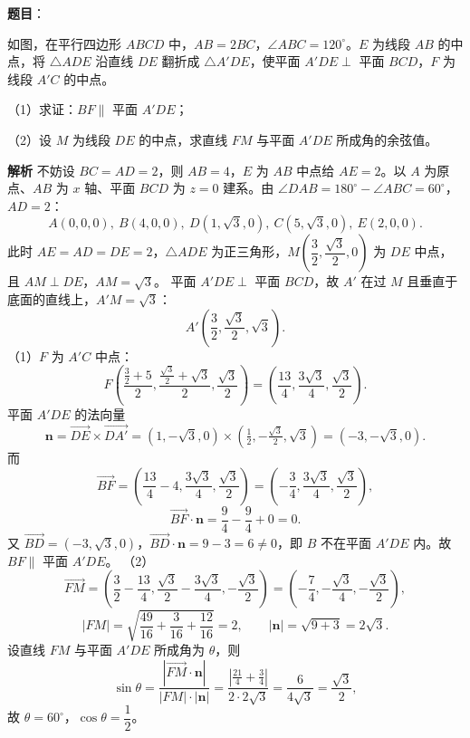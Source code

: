 \begin{answer}

\textbf{题目}：

如图，在平行四边形 $ABCD$ 中，$AB=2BC$，$\angle ABC=120^\circ$。$E$ 为线段 $AB$ 的中点，将 $\triangle ADE$ 沿直线 $DE$ 翻折成 $\triangle A'DE$，使平面 $A'DE\perp$ 平面 $BCD$，$F$ 为线段 $A'C$ 的中点。

（1）求证：$BF\parallel$ 平面 $A'DE$；

（2）设 $M$ 为线段 $DE$ 的中点，求直线 $FM$ 与平面 $A'DE$ 所成角的余弦值。
\nopagebreak[4]
\begin{center}\end{center}
\nopagebreak[4]
\textbf{解析}
不妨设 $BC=AD=2$，则 $AB=4$，$E$ 为 $AB$ 中点给 $AE=2$。以 $A$ 为原点、$AB$ 为 $x$ 轴、平面 $BCD$ 为 $z=0$ 建系。由 $\angle DAB=180^\circ-\angle ABC=60^\circ$，$AD=2$：
\nopagebreak[4]
\[A(0,0,0),\ B(4,0,0),\ D(1,\sqrt3,0),\ C(5,\sqrt3,0),\ E(2,0,0).\]
此时 $AE=AD=DE=2$，$\triangle ADE$ 为正三角形，$M\left(\dfrac32,\dfrac{\sqrt3}2,0\right)$ 为 $DE$ 中点，且 $AM\perp DE$，$AM=\sqrt3$。
平面 $A'DE\perp$ 平面 $BCD$，故 $A'$ 在过 $M$ 且垂直于底面的直线上，$A'M=\sqrt3$：
\nopagebreak[4]
\[A'\left(\frac32,\frac{\sqrt3}2,\sqrt3\right).\]
（1）$F$ 为 $A'C$ 中点：
\nopagebreak[4]
\[F\left(\frac{\frac32+5}2,\frac{\frac{\sqrt3}2+\sqrt3}2,\frac{\sqrt3}2\right)
=\left(\frac{13}4,\frac{3\sqrt3}4,\frac{\sqrt3}2\right).\]
平面 $A'DE$ 的法向量
\nopagebreak[4]
\[\boldsymbol n=\overrightarrow{DE}\times\overrightarrow{DA'}
=(1,-\sqrt3,0)\times\left(\tfrac12,-\tfrac{\sqrt3}2,\sqrt3\right)=(-3,-\sqrt3,0).\]
而
\nopagebreak[4]
\[\overrightarrow{BF}=\left(\frac{13}4-4,\frac{3\sqrt3}4,\frac{\sqrt3}2\right)
=\left(-\frac34,\frac{3\sqrt3}4,\frac{\sqrt3}2\right),\]
\nopagebreak[4]
\[\overrightarrow{BF}\cdot\boldsymbol n=\frac94-\frac94+0=0.\]
又 $\overrightarrow{BD}=(-3,\sqrt3,0)$，$\overrightarrow{BD}\cdot\boldsymbol n=9-3=6\neq0$，即 $B$ 不在平面 $A'DE$ 内。故 $BF\parallel$ 平面 $A'DE$。
（2）
\nopagebreak[4]
\[\overrightarrow{FM}=\left(\frac32-\frac{13}4,\frac{\sqrt3}2-\frac{3\sqrt3}4,-\frac{\sqrt3}2\right)
=\left(-\frac74,-\frac{\sqrt3}4,-\frac{\sqrt3}2\right),\]
\nopagebreak[4]
\[|FM|=\sqrt{\frac{49}{16}+\frac3{16}+\frac{12}{16}}=2,\qquad
|\boldsymbol n|=\sqrt{9+3}=2\sqrt3.\]
设直线 $FM$ 与平面 $A'DE$ 所成角为 $\theta$，则
\nopagebreak[4]
\[\sin\theta=\frac{|\overrightarrow{FM}\cdot\boldsymbol n|}{|FM|\cdot|\boldsymbol n|}
=\frac{\left|\frac{21}4+\frac34\right|}{2\cdot2\sqrt3}=\frac6{4\sqrt3}=\frac{\sqrt3}2,\]
故 $\theta=60^\circ$，$\cos\theta=\dfrac12$。


\end{answer}
